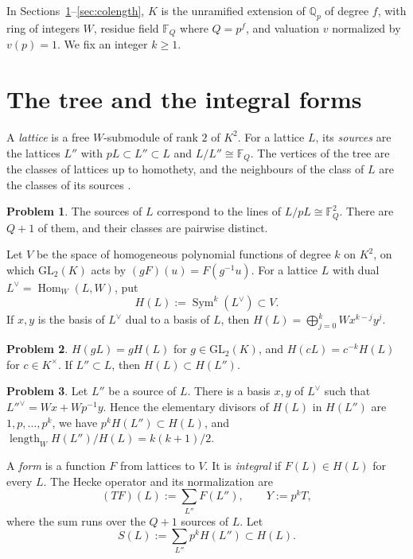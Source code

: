 \documentclass[reqno]{amsart}
\theoremstyle{definition}
\newtheorem{problem}{Problem}[section]
\theoremstyle{plain}
\newcommand{\Q}{\mathbb{Q}}
\newcommand{\F}{\mathbb{F}}
\newcommand{\Sym}{\operatorname{Sym}}
\newcommand{\Hom}{\operatorname{Hom}}
\newcommand{\GL}{\mathrm{GL}}
\newcommand{\len}{\operatorname{length}}
\begin{document}
In Sections~\ref{sec:tree}--\ref{sec:colength}, \(K\) is the unramified extension of \(\Q_p\) of degree \(f\), with ring of integers \(W\), residue field \(\F_Q\) where \(Q = p^f\), and valuation \(v\) normalized by \(v(p) = 1\).  We fix an integer \(k \ge 1\).

\section{The tree and the integral forms}\label{sec:tree}

A \emph{lattice} is a free \(W\)-submodule of rank \(2\) of \(K^2\).  For a lattice \(L\), its \emph{sources} are the lattices \(L''\) with \(pL \subset L'' \subset L\) and \(L/L'' \cong \F_Q\).  The vertices of the tree are the classes of lattices up to homothety, and the neighbours of the class of \(L\) are the classes of its sources \cite[Ch.~II, \S1]{SeT}.

\begin{problem}\label{pr:sources}
The sources of \(L\) correspond to the lines of \(L/pL \cong \F_Q^2\).  There are \(Q + 1\) of them, and their classes are pairwise distinct.
\end{problem}

Let \(V\) be the space of homogeneous polynomial functions of degree \(k\) on \(K^2\), on which \(\GL_2(K)\) acts by \((gF)(u) = F(g^{-1}u)\).  For a lattice \(L\) with dual \(L^\vee = \Hom_W(L, W)\), put
\[
  H(L) := \Sym^k(L^\vee) \subset V .
\]
If \(x, y\) is the basis of \(L^\vee\) dual to a basis of \(L\), then \(H(L) = \bigoplus_{j=0}^k W x^{k-j} y^j\).

\begin{problem}\label{pr:equivariance}
\(H(gL) = gH(L)\) for \(g \in \GL_2(K)\), and \(H(cL) = c^{-k} H(L)\) for \(c \in K^\times\).  If \(L'' \subset L\), then \(H(L) \subset H(L'')\).
\end{problem}

\begin{problem}\label{pr:one-edge}
Let \(L''\) be a source of \(L\).  There is a basis \(x, y\) of \(L^\vee\) such that \(L''^\vee = Wx + Wp^{-1}y\).  Hence the elementary divisors of \(H(L)\) in \(H(L'')\) are \(1, p, \dots, p^k\), we have \(p^k H(L'') \subset H(L)\), and \(\len_W H(L'')/H(L) = k(k+1)/2\).
\end{problem}

A \emph{form} is a function \(F\) from lattices to \(V\).  It is \emph{integral} if \(F(L) \in H(L)\) for every \(L\).  The Hecke operator and its normalization are
\[
  (TF)(L) := \sum_{L''} F(L''), \qquad Y := p^k T ,
\]
where the sum runs over the \(Q + 1\) sources of \(L\).  Let
\[
  S(L) := \sum_{L''} p^k H(L'') \subset H(L) .
\]
\end{document}
